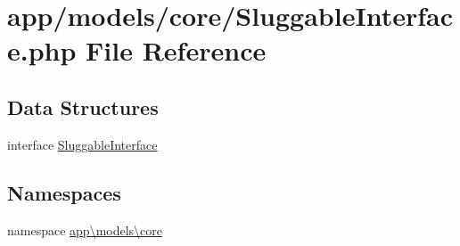 \hypertarget{_sluggable_interface_8php}{\section{app/models/core/\-Sluggable\-Interface.php File Reference}
\label{_sluggable_interface_8php}
}
\subsection*{Data Structures}
\begin{DoxyCompactItemize}
\item 
interface \hyperlink{interfaceapp_1_1models_1_1core_1_1_sluggable_interface}{Sluggable\-Interface}
\end{DoxyCompactItemize}
\subsection*{Namespaces}
\begin{DoxyCompactItemize}
\item 
namespace \hyperlink{namespaceapp_1_1models_1_1core}{app\textbackslash{}models\textbackslash{}core}
\end{DoxyCompactItemize}
